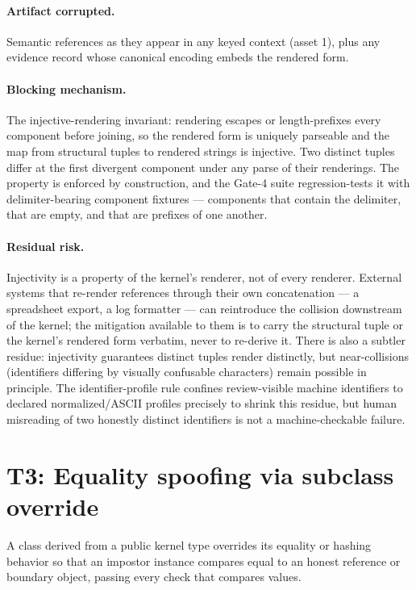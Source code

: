 \paragraph{Artifact corrupted.} Semantic references as they appear in any keyed context (asset 1), plus any evidence record whose canonical encoding embeds the rendered form.

\paragraph{Blocking mechanism.} The injective-rendering invariant: rendering escapes or length-prefixes every component before joining, so the rendered form is uniquely parseable and the map from structural tuples to rendered strings is injective. Two distinct tuples differ at the first divergent component under any parse of their renderings. The property is enforced by construction, and the Gate-4 suite regression-tests it with delimiter-bearing component fixtures --- components that contain the delimiter, that are empty, and that are prefixes of one another.

\paragraph{Residual risk.} Injectivity is a property of the kernel's renderer, not of every renderer. External systems that re-render references through their own concatenation --- a spreadsheet export, a log formatter --- can reintroduce the collision downstream of the kernel; the mitigation available to them is to carry the structural tuple or the kernel's rendered form verbatim, never to re-derive it. There is also a subtler residue: injectivity guarantees distinct tuples render distinctly, but near-collisions (identifiers differing by visually confusable characters) remain possible in principle. The identifier-profile rule confines review-visible machine identifiers to declared normalized/ASCII profiles precisely to shrink this residue, but human misreading of two honestly distinct identifiers is not a machine-checkable failure.

\section{T3: Equality spoofing via subclass override}\label{threat:t3}

\begin{threat}\label{threat:thr:spoof}
A class derived from a public kernel type overrides its equality or hashing behavior so that an impostor instance compares equal to an honest reference or boundary object, passing every check that compares values.
\end{threat}

